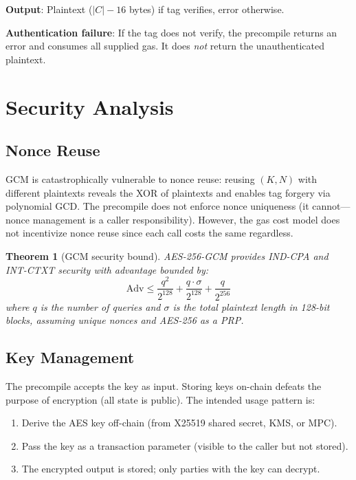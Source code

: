 \documentclass[11pt,a4paper]{article}
\newtheorem{theorem}{Theorem}
\begin{document}
\textbf{Output}: Plaintext ($|C| - 16$ bytes) if tag verifies, error otherwise.

\textbf{Authentication failure}: If the tag does not verify, the precompile returns
an error and consumes all supplied gas. It does \emph{not} return the unauthenticated
plaintext.

\section{Security Analysis}

\subsection{Nonce Reuse}

GCM is catastrophically vulnerable to nonce reuse: reusing $(K, N)$ with different
plaintexts reveals the XOR of plaintexts and enables tag forgery via polynomial
GCD. The precompile does not enforce nonce uniqueness (it cannot---nonce management
is a caller responsibility). However, the gas cost model does not incentivize
nonce reuse since each call costs the same regardless.

\begin{theorem}[GCM security bound]
AES-256-GCM provides IND-CPA and INT-CTXT security with advantage bounded by:
\[
  \text{Adv} \leq \frac{q^2}{2^{128}} + \frac{q \cdot \sigma}{2^{128}} + \frac{q}{2^{256}}
\]
where $q$ is the number of queries and $\sigma$ is the total plaintext length in
128-bit blocks, assuming unique nonces and AES-256 as a PRP.
\end{theorem}

\subsection{Key Management}

The precompile accepts the key as input. Storing keys on-chain defeats the purpose
of encryption (all state is public). The intended usage pattern is:
\begin{enumerate}
  \item Derive the AES key off-chain (from X25519 shared secret, KMS, or MPC).
  \item Pass the key as a transaction parameter (visible to the caller but not stored).
  \item The encrypted output is stored; only parties with the key can decrypt.
\end{enumerate}
\end{document}
